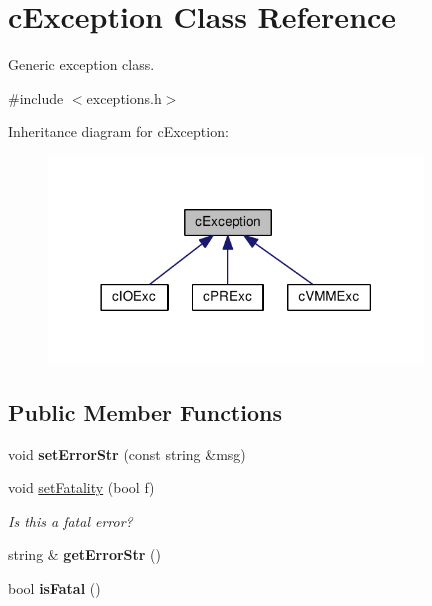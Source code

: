 \hypertarget{classcException}{\section{c\-Exception \-Class \-Reference}
\label{d3/d42/classcException}
}


\-Generic exception class.  




{\ttfamily \#include $<$exceptions.\-h$>$}



\-Inheritance diagram for c\-Exception\-:\nopagebreak
\begin{figure}[H]
\begin{center}
\leavevmode
\includegraphics[width=282pt]{d8/d8b/classcException__inherit__graph}
\end{center}
\end{figure}
\subsection*{\-Public \-Member \-Functions}
\begin{DoxyCompactItemize}
\item 
\hypertarget{classcException_acfea75107323730d40fb9c51d1283db4}{void {\bfseries set\-Error\-Str} (const string \&msg)}\label{d3/d42/classcException_acfea75107323730d40fb9c51d1283db4}

\item 
void \hyperlink{classcException_a8b5b59765cea5af7c827399d07b0b47e}{set\-Fatality} (bool f)
\begin{DoxyCompactList}\small\item\em \-Is this a fatal error? \end{DoxyCompactList}\item 
\hypertarget{classcException_aa51695c5454c316f6beed190b6fa5a22}{string \& {\bfseries get\-Error\-Str} ()}\label{d3/d42/classcException_aa51695c5454c316f6beed190b6fa5a22}

\item 
\hypertarget{classcException_a2c75c6b63164915792b867b673e451a3}{bool {\bfseries is\-Fatal} ()}\label{d3/d42/classcException_a2c75c6b63164915792b867b673e451a3}

\end{DoxyCompactItemize}
